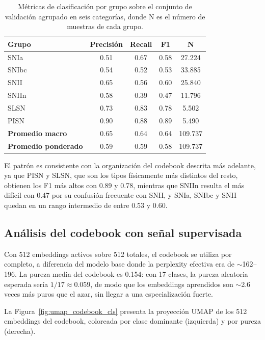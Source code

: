 \begin{table}[H]
\centering
\begin{tabular}{|l|c|c|c|c|}
\hline
\textbf{Grupo} & \textbf{Precisión} & \textbf{Recall} & \textbf{F1} & \textbf{N} \\
\hline
SNIa  & 0.51 & 0.67 & 0.58 & 27.224 \\
SNIbc & 0.54 & 0.52 & 0.53 & 33.885 \\
SNII  & 0.65 & 0.56 & 0.60 & 25.840 \\
SNIIn & 0.58 & 0.39 & 0.47 & 11.796 \\
SLSN  & 0.73 & 0.83 & 0.78 &  5.502 \\
PISN  & 0.90 & 0.88 & 0.89 &  5.490 \\
\hline
\textbf{Promedio macro}     & 0.65 & 0.64 & 0.64 & 109.737 \\
\textbf{Promedio ponderado} & 0.59 & 0.59 & 0.58 & 109.737 \\
\hline
\end{tabular}
\caption{Métricas de clasificación por grupo sobre el conjunto de validación agrupado en seis categorías, donde N es el número de muestras de cada grupo.}
\label{tab:cls_grouped_metrics}
\end{table}

El patrón es consistente con la organización del codebook descrita más adelante, ya que PISN y SLSN, que son los tipos físicamente más distintos del resto, obtienen los F1 más altos con 0.89 y 0.78, mientras que SNIIn resulta el más difícil con 0.47 por su confusión frecuente con SNII, y SNIa, SNIbc y SNII quedan en un rango intermedio de entre 0.53 y 0.60.

\subsection{Análisis del codebook con señal supervisada}

Con 512 embeddings activos sobre 512 totales, el codebook se utiliza por 
completo, a diferencia del modelo base donde la perplexity efectiva era de 
$\sim$162--196. La pureza media del codebook es 0.154: con 17 clases, la 
pureza aleatoria esperada sería $1/17 \approx 0.059$, de modo que los 
embeddings aprendidos son $\sim$2.6 veces más puros que el azar, sin llegar 
a una especialización fuerte.

La Figura~\ref{fig:umap_codebook_cls} presenta la proyección UMAP de los 512 
embeddings del codebook, coloreada por clase dominante (izquierda) y por 
pureza (derecha).

